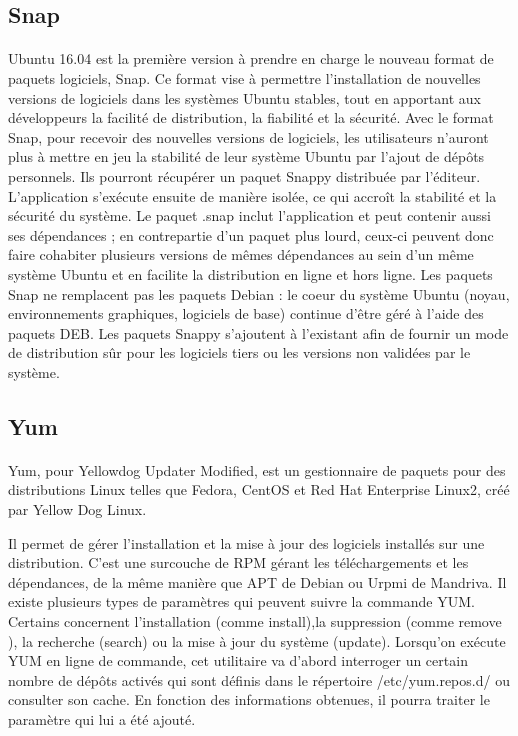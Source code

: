 \documentclass[a4paper,12pt]{article}
\begin{document}
\subsection{Snap}
\paragraph{}
Ubuntu 16.04 est la première version à prendre en charge le nouveau format de paquets logiciels, Snap. Ce format vise à permettre l'installation de nouvelles versions de logiciels dans les systèmes Ubuntu stables, tout en apportant
aux développeurs la facilité de distribution, la fiabilité et la sécurité.
Avec le format Snap, pour recevoir des nouvelles versions de logiciels, les utilisateurs n'auront plus à mettre en jeu la stabilité de leur système Ubuntu par l'ajout de dépôts personnels. Ils pourront récupérer un paquet 
Snappy distribuée par l'éditeur. L'application s'exécute ensuite de manière isolée, ce qui accroît la stabilité et la sécurité du système. Le paquet .snap inclut l'application et peut contenir aussi ses dépendances ; 
en contrepartie d'un paquet plus lourd, ceux-ci peuvent donc faire cohabiter plusieurs versions de mêmes dépendances au sein d'un même système Ubuntu et en facilite la distribution en ligne et hors ligne.
Les paquets Snap ne remplacent pas les paquets Debian : le coeur du système Ubuntu (noyau, environnements graphiques, logiciels de base) continue d'être géré à l'aide des paquets DEB. 
Les paquets Snappy s'ajoutent à l'existant afin de fournir un mode de distribution sûr pour les logiciels tiers ou les versions non validées par le système.

\subsection{Yum}
\paragraph{}
Yum, pour Yellowdog Updater Modified, est un gestionnaire de paquets pour des distributions Linux telles que Fedora, CentOS et Red Hat Enterprise Linux2, créé par Yellow Dog Linux.

Il permet de gérer l'installation et la mise à jour des logiciels installés sur une distribution. C'est une surcouche de RPM gérant les téléchargements et les dépendances, de la même manière que APT de Debian ou Urpmi de Mandriva.
Il existe plusieurs types de paramètres qui peuvent suivre la commande YUM. Certains concernent l'installation (comme install),la suppression (comme remove ), la recherche (search) ou la mise à jour du système (update). Lorsqu'on exécute YUM 
en ligne de commande, cet utilitaire va d'abord interroger un certain nombre de dépôts activés qui sont définis dans le répertoire /etc/yum.repos.d/ ou consulter son cache. En fonction des informations obtenues, il pourra traiter le paramètre qui lui a été ajouté.
\end{document}
